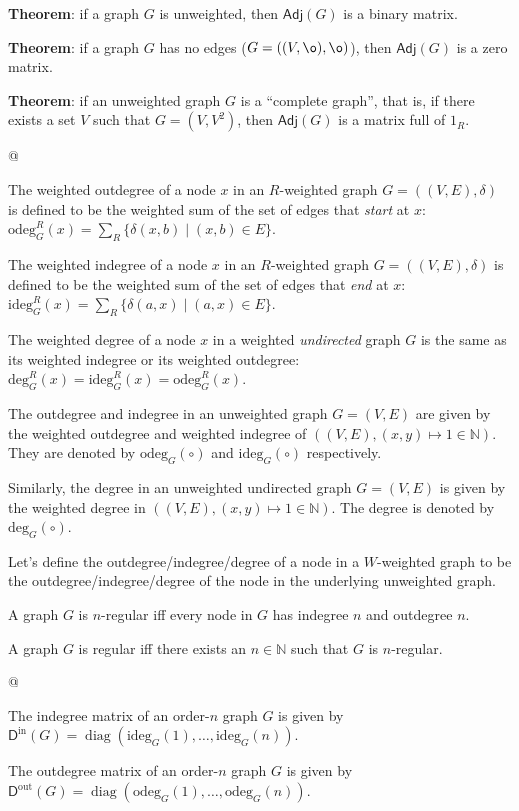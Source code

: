 \documentclass[]{article}
\newcommand{\textbs}[1]{{\sffamily\fontseries{sbc}\selectfont #1}}
\newcommand{\mbb}[1]{\ensuremath{\mathbb{#1}}}     %
\newcommand{\mrm}[1]{\ensuremath{\mathrm{#1}}}     %
\newcommand{\msf}[1]{\ensuremath{\mathsf{#1}}}     %
\renewcommand{\empty}[0]{\ensuremath{\o}}
\newcommand{\degree}[3]{\ensuremath{\mrm{deg}_{#2}^{#1}(#3)}}
\newcommand{\indegree}[3]{\ensuremath{\mrm{ideg}_{#2}^{#1}(#3)}}
\newcommand{\outdegree}[3]{\ensuremath{\mrm{odeg}_{#2}^{#1}(#3)}}
\DeclareMathOperator{\diag}{diag}
\newcommand{\define}[1]{\textbs{#1}}
\begin{document}
\begin{refsection}
\begin{easylist}[itemize]
{  \textbf{Theorem}:
  if a graph $G$ is unweighted, then $\msf{Adj}(G)$ is a binary matrix.

  \textbf{Theorem}:
  if a graph $G$ has no edges ($G = ((V, \empty), \empty)$),
  then $\msf{Adj}(G)$ is a zero matrix.

  \textbf{Theorem}:
  if an unweighted graph $G$ is a ``complete graph'', that is, if there
  exists a set $V$ such that $G = (V, V^2)$, then $\msf{Adj}(G)$ is a matrix
  full of $1_R$.
}
@ {%
  The \define{weighted outdegree} of a node $x$ in an $R$-weighted graph
  $G = ((V, E), \delta)$ is defined to be the weighted sum of the set of edges
  that \textit{start} at $x$:
  $\outdegree{R}{G}{x} = \sum_R \{\delta(x, b) \mid (x, b) \in E\}$.

  The \define{weighted indegree} of a node $x$ in an $R$-weighted graph
  $G = ((V, E), \delta)$ is defined to be the weighted sum of the set of edges
  that \textit{end} at $x$:
  $\indegree{R}{G}{x} = \sum_R \{\delta(a, x) \mid (a, x) \in E\}$.

  The \define{weighted degree} of a node $x$ in a weighted \textit{undirected}
  graph $G$ is the same as its weighted indegree or its weighted outdegree:
  $\degree{R}{G}{x} = \indegree{R}{G}{x} = \outdegree{R}{G}{x}$.

  The \define{outdegree} and \define{indegree} in an unweighted graph
  $G = (V, E)$ are given by the weighted outdegree and weighted indegree of
  $((V, E), (x, y) \mapsto 1 \in \mbb{N})$.
  They are denoted by $\outdegree{}{G}{\circ}$ and $\indegree{}{G}{\circ}$
  respectively.

  Similarly, the \define{degree} in an unweighted undirected graph $G = (V, E)$
  is given by the weighted degree in $((V, E), (x, y) \mapsto 1 \in \mbb{N})$.
  The degree is denoted by $\degree{}{G}{\circ}$.

  Let's define the outdegree/indegree/degree of a node in a $W$-weighted graph
  to be the outdegree/indegree/degree of the node in the underlying unweighted
  graph.

  A graph $G$ is \define{$n$-regular} iff every node in $G$ has indegree $n$
  and outdegree $n$.

  A graph $G$ is \define{regular} iff there exists an $n \in \mbb{N}$ such
  that $G$ is $n$-regular.
}
@ {%
  The \define{indegree matrix} of an order-$n$ graph $G$ is given by
  $\msf{D}^\mrm{in}(G) = \diag(\indegree{}{G}{1}, \dotsc, \indegree{}{G}{n})$.

  The \define{outdegree matrix} of an order-$n$ graph $G$ is given by
  $\msf{D}^\mrm{out}(G) = \diag(\outdegree{}{G}{1}, \dotsc, \outdegree{}{G}{n})$.

}
\end{easylist}
\end{refsection}
\end{document}
